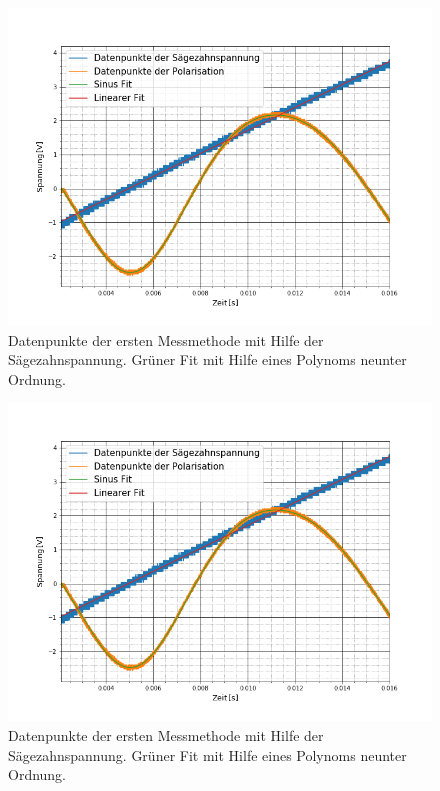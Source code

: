 \begin{figure}[ht]
	\includegraphics[scale=0.5]{Bild/V1_7}
	\centering
	\caption[Plot zu Versuchsteil 1 Nr.7]{Datenpunkte der ersten Messmethode mit Hilfe der Sägezahnspannung. Grüner Fit mit Hilfe eines Polynoms neunter Ordnung.}
\end{figure}
\begin{figure}[ht]
	\includegraphics[scale=0.5]{Bild/V1_8}
	\centering
	\caption[Plot zu Versuchsteil 1 Nr.8]{Datenpunkte der ersten Messmethode mit Hilfe der Sägezahnspannung. Grüner Fit mit Hilfe eines Polynoms neunter Ordnung.}
\end{figure}
